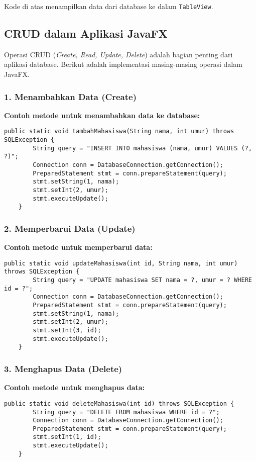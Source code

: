 Kode di atas menampilkan data dari database ke dalam \texttt{TableView}.

\subsection{CRUD dalam Aplikasi JavaFX}

Operasi CRUD (\textit{Create, Read, Update, Delete}) adalah bagian penting dari aplikasi database. Berikut adalah implementasi masing-masing operasi dalam JavaFX.

\subsubsection{1. Menambahkan Data (Create)}

\textbf{Contoh metode untuk menambahkan data ke database:}
\begin{lstlisting}[style=JavaStyle, caption=Menambahkan data ke database]
	public static void tambahMahasiswa(String nama, int umur) throws SQLException {
		String query = "INSERT INTO mahasiswa (nama, umur) VALUES (?, ?)";
		Connection conn = DatabaseConnection.getConnection();
		PreparedStatement stmt = conn.prepareStatement(query);
		stmt.setString(1, nama);
		stmt.setInt(2, umur);
		stmt.executeUpdate();
	}
\end{lstlisting}

\subsubsection{2. Memperbarui Data (Update)}

\textbf{Contoh metode untuk memperbarui data:}
\begin{lstlisting}[style=JavaStyle, caption=Memperbarui data mahasiswa]
	public static void updateMahasiswa(int id, String nama, int umur) throws SQLException {
		String query = "UPDATE mahasiswa SET nama = ?, umur = ? WHERE id = ?";
		Connection conn = DatabaseConnection.getConnection();
		PreparedStatement stmt = conn.prepareStatement(query);
		stmt.setString(1, nama);
		stmt.setInt(2, umur);
		stmt.setInt(3, id);
		stmt.executeUpdate();
	}
\end{lstlisting}

\subsubsection{3. Menghapus Data (Delete)}

\textbf{Contoh metode untuk menghapus data:}
\begin{lstlisting}[style=JavaStyle, caption=Menghapus data mahasiswa]
	public static void deleteMahasiswa(int id) throws SQLException {
		String query = "DELETE FROM mahasiswa WHERE id = ?";
		Connection conn = DatabaseConnection.getConnection();
		PreparedStatement stmt = conn.prepareStatement(query);
		stmt.setInt(1, id);
		stmt.executeUpdate();
	}
\end{lstlisting}

